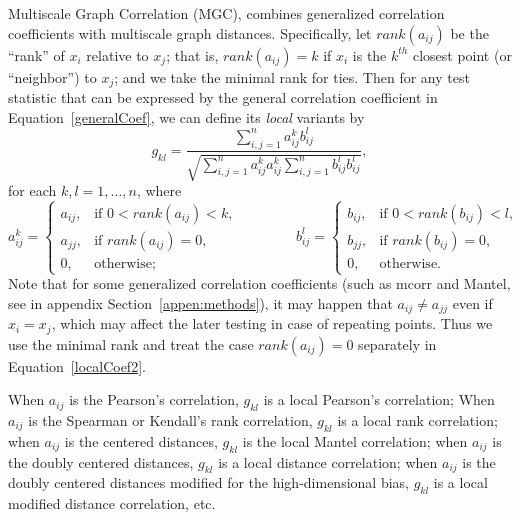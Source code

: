 \documentclass[11pt]{article}
\begin{document}
Multiscale Graph Correlation (MGC), combines generalized correlation coefficients with multiscale graph distances.  Specifically, let $rank(a_{ij})$  be the ``rank'' of $x_i$ relative to $x_j$; that is, $rank(a_{ij})=k$ if $x_i$ is the $k^{th}$ closest point (or ``neighbor'') to $x_j$; and we take the minimal rank for ties.  Then for any test statistic that can be expressed by the general correlation coefficient in Equation~\ref{generalCoef}, we can define its \emph{local} variants by
\begin{equation}
\label{localCoef}
g_{kl}=\frac{\sum_{i,j=1}^n a_{ij}^k b_{ij}^l}{\sqrt{\sum_{i,j=1}^n  a_{ij}^{k} a_{ij}^{k} \sum_{i,j=1}^n b_{ij}^{l} b_{ij}^{l}}},
\end{equation}
for each $k,l=1,\ldots,n$, where
\begin{equation}
\label{localCoef2}
    a_{ij}^k=
    \begin{cases}
      a_{ij}, & \text{if } 0 < rank(a_{ij}) < k, \\
			a_{jj}, & \text{if } rank(a_{ij}) =0, \\
      0, & \text{otherwise};
    \end{cases} \qquad \qquad
    b_{ij}^l=
    \begin{cases}
      b_{ij}, & \text{if } 0 < rank(b_{ij}) < l, \\
			b_{jj}, & \text{if } rank(b_{ij}) =0, \\
      0, & \text{otherwise}.
    \end{cases}
\end{equation}
Note that for some generalized correlation coefficients (such as mcorr and Mantel, see in appendix Section~\ref{appen:methods}), it may happen that $a_{ij} \neq a_{jj}$ even if $x_{i}=x_{j}$, which may affect the later testing in case of repeating points. Thus we use the minimal rank and treat the case $rank(a_{ij})=0$ separately in Equation~\ref{localCoef2}.

When $a_{ij}$ is the Pearson's correlation, $g_{kl}$ is a local Pearson's correlation;
When $a_{ij}$ is the Spearman or Kendall's rank correlation, $g_{kl}$ is a local rank correlation;
when $a_{ij}$ is the centered distances, $g_{kl}$ is the local Mantel correlation;
when $a_{ij}$ is the doubly centered distances, $g_{kl}$ is a local distance correlation;
when $a_{ij}$ is the doubly centered distances modified for the high-dimensional bias, $g_{kl}$ is a local modified distance correlation, etc.
\end{document}
